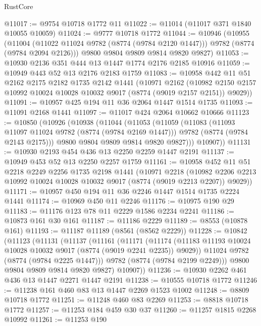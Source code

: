 \begin{lexlean}{RustCore}
\begin{coremodule}
@11017 := @9754 @10718 @1772 @11
@11022 := @11014 (@11017 @371 @1840 @10055 @10059)
@11024 := @9777 @10718 @1772
@11044 := @10946
    (@10955
      (@11004 (@11022 @11024 @9782 (@8774 (@9784 @2120 @1447))) @9782 (@8774 (@9784 @2094 @2126)))
      @9800
      @9804
      @9809
      @9814
      @9820
      @9827)
@11053 := @10930 @2136 @351 @444 @13 @1447 @1774 @2176 @2185 @10916
@11059 := @10949 @443 @52 @13 @2176 @2183 @1759
@11083 := @10958
    @442
    @11
    @51
    @2162
    @2175
    @2182
    @1735
    @2142
    @1441
    (@10971
      @2162
      (@10982 @2150 @2157 @10992 @10024 @10028 @10032 @9017 (@8774 (@9019 @2157 @2151)) @9029))
@11091 := @10957 @425 @194 @11 @36 @2064 @1447 @1514 @1735
@11093 := @11091 @2168 @1441
@11097 := @11017 @424 @2064 @10662 @10666
@11123 := @10850
    (@10926
      (@10938
        (@11044
          (@11053
            (@11059
              (@11083
                (@11093 @11097 @11024 @9782 (@8774 (@9784 @2169 @1447)))
                @9782
                (@8774 (@9784 @2143 @2175)))
              @9800
              @9804
              @9809
              @9814
              @9820
              @9827)))
        @10907))
@11131 := @10930 @2193 @454 @436 @13 @2250 @2259 @1447 @2191
@11137 := @10949 @453 @52 @13 @2250 @2257 @1759
@11161 := @10958
    @452
    @11
    @51
    @2218
    @2249
    @2256
    @1735
    @2198
    @1441
    (@10971
      @2218
      (@10982 @2206 @2213 @10992 @10024 @10028 @10032 @9017 (@8774 (@9019 @2213 @2207)) @9029))
@11171 := @10957 @450 @194 @11 @36 @2246 @1447 @1514 @1735 @2224 @1441
@11174 := @10969 @450 @11 @2246
@11176 := @10975 @190 @29
@11183 := @11176 @123 @78 @11 @2229 @1586 @2234 @2241
@11186 := @10873 @161 @30 @161
@11187 := @11186 @2229
@11189 := @8553 (@10878 @161)
@11193 := @11187 @11189 (@8561 (@8562 @2229))
@11228 := @10842
    (@11123
      (@11131
        (@11137
          (@11161
            (@11171
              (@11174 (@11183 @11193 @10024 @10028 @10032 @9017 (@8774 (@9019 @2241 @2235)) @9029))
              @11024
              @9782
              (@8774 (@9784 @2225 @1447)))
            @9782
            (@8774 (@9784 @2199 @2249)))
          @9800
          @9804
          @9809
          @9814
          @9820
          @9827)
        @10907))
@11236 := @10930 @2262 @461 @436 @13 @1447 @2271 @1447 @2191
@11238 := @10555 @10718 @1772
@11246 := @11238 @161 @460 @83 @13 @1447 @2269 @1523 @1002
@11248 := @8809 @10718 @1772
@11251 := @11248 @460 @83 @2269
@11253 := @8818 @10718 @1772
@11257 := @11253 @184 @459 @30 @37
@11260 := @11257 @1815 @2268 @10992
@11261 := @11253 @190

\end{coremodule}
\end{lexlean}
